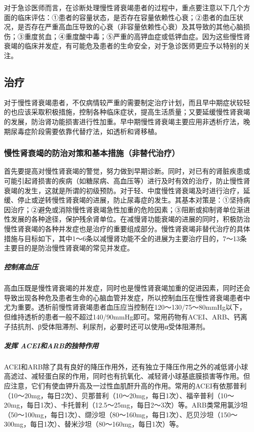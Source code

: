 对于急诊医师而言，在诊断处理慢性肾衰竭患者的过程中，重点要注意以下几个方面的临床评估：①患者的容量状态，是否存在容量依赖性心衰；②患者的血压状况，是否存在严重高血压导致的心衰（非容量依赖性心衰）及其导致的其他心脑损伤；③重度贫血；④重度酸中毒；⑤严重的高钾血症或低钾血症。因为这些慢性肾衰竭的临床并发症，有可能危及患者的生命安全，对于急诊医师更应予以特别的关注。

\subsection{治疗}

对于慢性肾衰竭患者，不仅病情较严重的需要制定治疗计划，而且早中期症状较轻的也应该采取积极措施，控制各种临床症状，提高生活质量；又要延缓慢性肾衰竭的发展，防治肾功能损害进行性加重。早中期慢性肾衰竭主要应用非透析疗法，晚期尿毒症阶段需要依靠代替疗法，如透析和肾移植。

\subsubsection{慢性肾衰竭的防治对策和基本措施（非替代治疗）}

首先要提高对慢性肾衰竭的警觉，努力做到早期诊断。同时，对已有的肾脏疾患或可能引起肾损害的疾病（如糖尿病、高血压等）进行及时有效的治疗，防止慢性肾衰竭的发生，这就是所谓的初级预防。对于轻、中度慢性肾衰竭及时进行治疗，延缓、停止或逆转慢性肾衰竭的进展，防止尿毒症的发生。其基本对策是：①坚持病因治疗；②避免或消除慢性肾衰竭急性加重的危险因素；③阻断或抑制肾单位渐进性发展的各种途径，保护残余肾单位。在减慢肾功能衰竭的进展的同时，积极防治慢性肾衰竭的各种并发症也是治疗的重要组成部分。慢性肾衰竭非替代治疗的具体措施与目标如下，其中1～6条以减慢肾功能不全的进展为主要治疗目的，7～13条主要目的是防治慢性肾衰竭的常见并发症。

\subparagraph{控制高血压}

高血压既是慢性肾衰竭的并发症，同时也是慢性肾衰竭加重的促进因素，同时还会导致出现各种危及患者生命的心脑血管并发症，所以控制血压在慢性肾衰竭患者中尤为重要。透析前慢性肾衰竭患者血压应当控制在120～130/75～80mmHg以下，但维持透析的患者一般不超过140/90mmHg即可。常用药物有ACEI、ARB、钙离子拮抗剂、β受体阻滞剂、利尿剂，必要时还可以使用α受体阻滞剂。

\subparagraph{发挥 ACEI和ARB的独特作用}

ACEI和ARB除了具有良好的降压作用外，还有独立于降压作用之外的减低肾小球高滤过、减轻蛋白尿的作用，同时也有抗氧化、减轻肾小球基底膜损害等作用。但应注意，它们有使血钾升高及一过性血肌酐升高的作用。常用的ACEI有依那普利（10～20mg，每日2次）、贝那普利（10～20mg，每日1次）、福辛普利（10～20mg，每日1次）、卡托普利（12.5～25mg，每日2～3次）等。ARB类常用氯沙坦（50～100mg，每日1次）、缬沙坦（80～160mg，每日1次）、厄贝沙坦（150～300mg，每日1次）、替米沙坦（80～160mg，每日1次）等。

